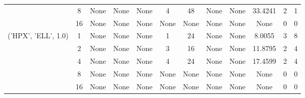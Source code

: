 \begin{tabular}{cccccccccccc}
& 8& None& None& None& 4& 48& None& None& 33.4241& 2& 1\\
& 16& None& None& None& None& None& None& None& None& 0& 0\\
\hline
\multirow{5}{*}{('HPX', 'ELL', 1.0)}& 1& None& None& None& 1& 24& None& None& 8.0055& 3& 8\\
& 2& None& None& None& 3& 16& None& None& 11.8795& 2& 4\\
& 4& None& None& None& 4& 24& None& None& 17.4599& 2& 4\\
& 8& None& None& None& None& None& None& None& None& 0& 0\\
& 16& None& None& None& None& None& None& None& None& 0& 0\\
\hline
\end{tabular}
